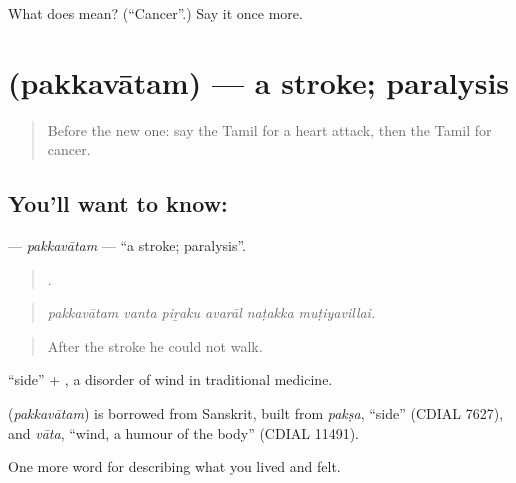 \begin{tcolorbox}[breakable,colback=teal!4,colframe=teal!35!black,title={Before you move on}]
What does  mean? (\textquotedblleft{}Cancer\textquotedblright{}.) Say it once more.
\end{tcolorbox}
\section[\texorpdfstring{\ta{பக்கவாதம்} (pakkavātam)}{பக்கவாதம் (pakkavātam)}]{ (pakkavātam) — a stroke; paralysis}

\label{lesson:TA-C477-pakkavatam}



\begin{quote}
Before the new one: say the Tamil for a heart attack, then the Tamil for cancer.
\end{quote}

\subsection*{You'll want to know: }
\textbf{} — \emph{pakkavātam} — \textquotedblleft{}a stroke; paralysis\textquotedblright{}.

\begin{quote}
     .
\end{quote}

\begin{quote}
\emph{pakkavātam vanta piṟaku avarāl naṭakka muṭiyavillai.}
\end{quote}

\begin{quote}
After the stroke he could not walk.
\end{quote}

 \textquotedblleft{}side\textquotedblright{} + , a disorder of wind in traditional medicine.

\begin{cousinweb}
\textbf{} (\emph{pakkavātam}) is borrowed from Sanskrit, built from \emph{pakṣa}, \textquotedblleft{}side\textquotedblright{} (CDIAL 7627), and \emph{vāta}, \textquotedblleft{}wind, a humour of the body\textquotedblright{} (CDIAL 11491).
\end{cousinweb}

\begin{grammarlens}[title={What you've built}]
One more word for describing what you lived and felt.
\end{grammarlens}

